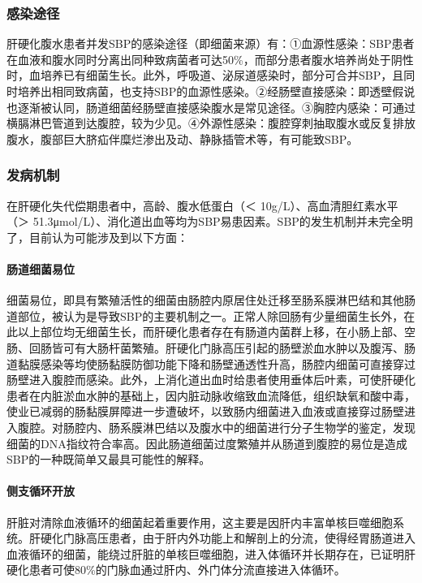 \subsubsection{感染途径}

肝硬化腹水患者并发SBP的感染途径（即细菌来源）有：①血源性感染：SBP患者在血液和腹水同时分离出同种致病菌者可达50\%，而部分患者腹水培养尚处于阴性时，血培养已有细菌生长。此外，呼吸道、泌尿道感染时，部分可合并SBP，且同时培养出相同致病菌，也支持SBP的血源性感染。②经肠壁直接感染：即透壁假说也逐渐被认同，肠道细菌经肠壁直接感染腹水是常见途径。③胸腔内感染：可通过横膈淋巴管道到达腹腔，较为少见。④外源性感染：腹腔穿刺抽取腹水或反复排放腹水，腹部巨大脐疝伴糜烂渗出及动、静脉插管术等，有可能致SBP。

\subsubsection{发病机制}

在肝硬化失代偿期患者中，高龄、腹水低蛋白（＜
10g/L）、高血清胆红素水平（＞
51.3μmol/L）、消化道出血等均为SBP易患因素。SBP的发生机制并未完全明了，目前认为可能涉及到以下方面：

\paragraph{肠道细菌易位}

细菌易位，即具有繁殖活性的细菌由肠腔内原居住处迁移至肠系膜淋巴结和其他肠道部位，被认为是导致SBP的主要机制之一。正常人除回肠有少量细菌生长外，在此以上部位均无细菌生长，而肝硬化患者存在有肠道内菌群上移，在小肠上部、空肠、回肠皆可有大肠杆菌繁殖。肝硬化门脉高压引起的肠壁淤血水肿以及腹泻、肠道黏膜感染等均使肠黏膜防御功能下降和肠壁通透性升高，肠腔内细菌可直接穿过肠壁进入腹腔而感染。此外，上消化道出血时给患者使用垂体后叶素，可使肝硬化患者在内脏淤血水肿的基础上，因内脏动脉收缩致血流降低，组织缺氧和酸中毒，使业已减弱的肠黏膜屏障进一步遭破坏，以致肠内细菌进入血液或直接穿过肠壁进入腹腔。对肠腔内、肠系膜淋巴结以及腹水中的细菌进行分子生物学的鉴定，发现细菌的DNA指纹符合率高。因此肠道细菌过度繁殖并从肠道到腹腔的易位是造成SBP的一种既简单又最具可能性的解释。

\paragraph{侧支循环开放}

肝脏对清除血液循环的细菌起着重要作用，这主要是因肝内丰富单核巨噬细胞系统。肝硬化门脉高压患者，由于肝内外功能上和解剖上的分流，使得经胃肠道进入血液循环的细菌，能绕过肝脏的单核巨噬细胞，进入体循环并长期存在，已证明肝硬化患者可使80\%的门脉血通过肝内、外门体分流直接进入体循环。

